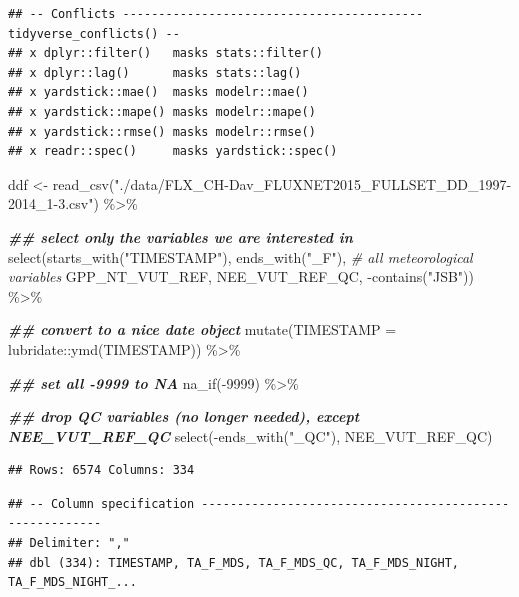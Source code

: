 \documentclass[
]{book}
\newenvironment{Shaded}{\begin{snugshade}}{\end{snugshade}}
\newcommand{\AttributeTok}[1]{\textcolor[rgb]{0.77,0.63,0.00}{#1}}
\newcommand{\CommentTok}[1]{\textcolor[rgb]{0.56,0.35,0.01}{\textit{#1}}}
\newcommand{\DecValTok}[1]{\textcolor[rgb]{0.00,0.00,0.81}{#1}}
\newcommand{\DocumentationTok}[1]{\textcolor[rgb]{0.56,0.35,0.01}{\textbf{\textit{#1}}}}
\newcommand{\FunctionTok}[1]{\textcolor[rgb]{0.00,0.00,0.00}{#1}}
\newcommand{\NormalTok}[1]{#1}
\newcommand{\OtherTok}[1]{\textcolor[rgb]{0.56,0.35,0.01}{#1}}
\newcommand{\SpecialCharTok}[1]{\textcolor[rgb]{0.00,0.00,0.00}{#1}}
\newcommand{\StringTok}[1]{\textcolor[rgb]{0.31,0.60,0.02}{#1}}
\begin{document}
\begin{verbatim}
## -- Conflicts ------------------------------------------ tidyverse_conflicts() --
## x dplyr::filter()   masks stats::filter()
## x dplyr::lag()      masks stats::lag()
## x yardstick::mae()  masks modelr::mae()
## x yardstick::mape() masks modelr::mape()
## x yardstick::rmse() masks modelr::rmse()
## x readr::spec()     masks yardstick::spec()
\end{verbatim}

\begin{Shaded}
\begin{Highlighting}[]
\NormalTok{ddf }\OtherTok{\textless{}{-}} \FunctionTok{read\_csv}\NormalTok{(}\StringTok{"./data/FLX\_CH{-}Dav\_FLUXNET2015\_FULLSET\_DD\_1997{-}2014\_1{-}3.csv"}\NormalTok{) }\SpecialCharTok{\%\textgreater{}\%} 
  
  \DocumentationTok{\#\# select only the variables we are interested in}
  \FunctionTok{select}\NormalTok{(}\FunctionTok{starts\_with}\NormalTok{(}\StringTok{"TIMESTAMP"}\NormalTok{),}
         \FunctionTok{ends\_with}\NormalTok{(}\StringTok{"\_F"}\NormalTok{),   }\CommentTok{\# all meteorological variables}
\NormalTok{         GPP\_NT\_VUT\_REF,}
\NormalTok{         NEE\_VUT\_REF\_QC,}
         \SpecialCharTok{{-}}\FunctionTok{contains}\NormalTok{(}\StringTok{"JSB"}\NormalTok{)) }\SpecialCharTok{\%\textgreater{}\%}

  \DocumentationTok{\#\# convert to a nice date object}
  \FunctionTok{mutate}\NormalTok{(}\AttributeTok{TIMESTAMP =}\NormalTok{ lubridate}\SpecialCharTok{::}\FunctionTok{ymd}\NormalTok{(TIMESTAMP)) }\SpecialCharTok{\%\textgreater{}\%}

  \DocumentationTok{\#\# set all {-}9999 to NA}
  \FunctionTok{na\_if}\NormalTok{(}\SpecialCharTok{{-}}\DecValTok{9999}\NormalTok{) }\SpecialCharTok{\%\textgreater{}\%}

  \DocumentationTok{\#\# drop QC variables (no longer needed), except NEE\_VUT\_REF\_QC}
  \FunctionTok{select}\NormalTok{(}\SpecialCharTok{{-}}\FunctionTok{ends\_with}\NormalTok{(}\StringTok{"\_QC"}\NormalTok{), NEE\_VUT\_REF\_QC)}
\end{Highlighting}
\end{Shaded}

\begin{verbatim}
## Rows: 6574 Columns: 334
\end{verbatim}

\begin{verbatim}
## -- Column specification --------------------------------------------------------
## Delimiter: ","
## dbl (334): TIMESTAMP, TA_F_MDS, TA_F_MDS_QC, TA_F_MDS_NIGHT, TA_F_MDS_NIGHT_...
\end{verbatim}
\end{document}
